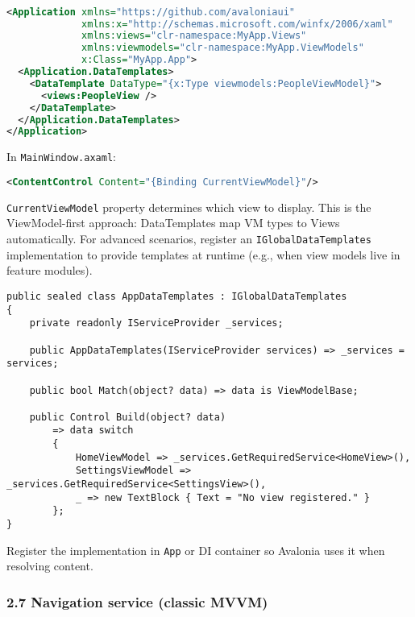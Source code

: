 \begin{lstlisting}[language=XML]

<Application xmlns="https://github.com/avaloniaui"
             xmlns:x="http://schemas.microsoft.com/winfx/2006/xaml"
             xmlns:views="clr-namespace:MyApp.Views"
             xmlns:viewmodels="clr-namespace:MyApp.ViewModels"
             x:Class="MyApp.App">
  <Application.DataTemplates>
    <DataTemplate DataType="{x:Type viewmodels:PeopleViewModel}">
      <views:PeopleView />
    </DataTemplate>
  </Application.DataTemplates>
</Application>
\end{lstlisting}

In \passthrough{\lstinline!MainWindow.axaml!}:

\begin{lstlisting}[language=XML]
<ContentControl Content="{Binding CurrentViewModel}"/>
\end{lstlisting}

\passthrough{\lstinline!CurrentViewModel!} property determines which
view to display. This is the ViewModel-first approach: DataTemplates map
VM types to Views automatically. For advanced scenarios, register an
\passthrough{\lstinline!IGlobalDataTemplates!} implementation to provide
templates at runtime (e.g., when view models live in feature modules).

\begin{lstlisting}
public sealed class AppDataTemplates : IGlobalDataTemplates
{
    private readonly IServiceProvider _services;

    public AppDataTemplates(IServiceProvider services) => _services = services;

    public bool Match(object? data) => data is ViewModelBase;

    public Control Build(object? data)
        => data switch
        {
            HomeViewModel => _services.GetRequiredService<HomeView>(),
            SettingsViewModel => _services.GetRequiredService<SettingsView>(),
            _ => new TextBlock { Text = "No view registered." }
        };
}
\end{lstlisting}

Register the implementation in \passthrough{\lstinline!App!} or DI
container so Avalonia uses it when resolving content.

\subsubsection{2.7 Navigation service (classic
MVVM)}\label{navigation-service-classic-mvvm}

